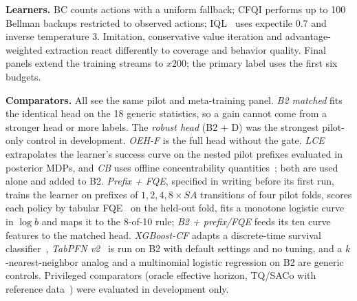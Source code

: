 \textbf{Learners.} BC counts actions with a uniform fallback; CFQI performs up to 100 Bellman backups restricted to observed actions; IQL~\cite{kostrikov2022iql} uses expectile 0.7 and inverse temperature 3. Imitation, conservative value iteration and advantage-weighted extraction react differently to coverage and behavior quality. Final panels extend the training streams to $x200$; the primary label uses the first six budgets.

\textbf{Comparators.} All see the same pilot and meta-training panel. \emph{B2 matched} fits the identical head on the 18 generic statistics, so a gain cannot come from a stronger head or more labels. The \emph{robust head} (B2 + D) was the strongest pilot-only control in development. \emph{OEH-F} is the full head without the gate. \emph{LCE} extrapolates the learner's success curve on the nested pilot prefixes evaluated in posterior MDPs, and \emph{CB} uses offline concentrability quantities~\cite{li2024sample}; both are used alone and added to B2. \emph{Prefix + FQE}, specified in writing before its first run, trains the learner on prefixes of $1,2,4,8\times SA$ transitions of four pilot folds, scores each policy by tabular FQE~\cite{le2019batch} on the held-out fold, fits a monotone logistic curve in $\log b$ and maps it to the 8-of-10 rule; \emph{B2 + prefix/FQE} feeds its ten curve features to the matched head. \emph{XGBoost-CF} adapts a discrete-time survival classifier~\cite{kim2026survival}, \emph{TabPFN v2}~\cite{hollmann2025accurate} is run on B2 with default settings and no tuning, and a $k$-nearest-neighbor analog and a multinomial logistic regression on B2 are generic controls. Privileged comparators (oracle effective horizon, TQ/SACo with reference data~\cite{schweighofer2022dataset}) were evaluated in development only.

